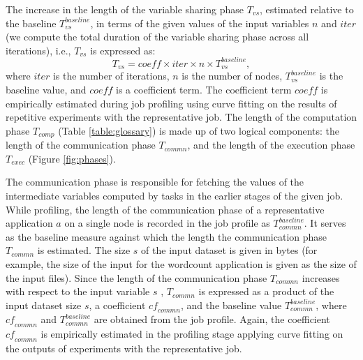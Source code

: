 \documentclass[conference]{IEEEtran}
\begin{document}
 The increase in the length of the variable sharing phase $\mathit{T_{\mathit{vs}}}$, estimated relative to the
 baseline
 $\mathit{T_{\mathit{vs}}^{\mathit{baseline}}}$,  in terms of the given values of the input variables $n$ and
 $\mathit{iter}$ (we compute the total duration of the variable sharing phase across all iterations), i.e., $\mathit{T_{vs}}$ is expressed as:  \begin{equation}\label{eqn:brd}
   \mathit{T_{\mathit{vs}}} = \mathit{coeff} \times \mathit{iter} \times n \times \mathit{T_{\mathit{vs}}^{\mathit{baseline}}},
   \end{equation}
   where $\mathit{iter}$ is the number of iterations,
   $n$ is the number of nodes, $\mathit{T_{\mathit{vs}}^{\mathit{baseline}}}$ is the baseline value, and $\mathit{coeff}$ is a coefficient term.
 The coefficient term $\mathit{coeff}$  is empirically estimated during job profiling using curve fitting on the results of repetitive experiments with the representative job.
  The length of the computation phase $\mathit{T_{\mathit{comp}}}$ (Table \ref{table:glossary})
is made up of two logical components:
 the length of the communication phase $\mathit{T_{\mathit{commn}}}$, and the length of the execution phase
 $\mathit{T_{\mathit{exec}}}$ (Figure \ref{fig:phases}). \par The communication phase is responsible for fetching the
 values of the intermediate variables computed by tasks in the
 earlier stages of the given job. While profiling, the length of the communication phase of a representative
 application $a$ on a single node is recorded in the job profile as $\mathit{T_{\mathit{commn}}^{\mathit{baseline}}}$. It serves as the baseline measure against
  which the length the communication phase $\mathit{T_{commn}}$ is estimated. The size $s$ of the input dataset is given in bytes (for example, the size of the input for the wordcount application is
 given as the size of the input files). Since the length of the communication phase $\mathit{T_{commn}}$ increases with respect to the input variable $s$ \cite{Zaharia:2012:RDD:2228298.2228301},
  $\mathit{T_{commn}}$ is expressed as a product
of the input dataset size $s$, a coefficient $\mathit{\mathit{cf}_{\mathit{commn}}}$, and the baseline value
$\mathit{T_{\mathit{commn}}^{baseline}}$, where $\mathit{\mathit{cf}_{\mathit{commn}}}$  and $\mathit{T_{\mathit{commn}}^{\mathit{baseline}}}$ are
obtained from the job profile. Again, the coefficient $\mathit{\mathit{cf}_{commn}}$ is empirically estimated in the
profiling stage applying curve fitting on the outputs of experiments with the representative job.
\end{document}
